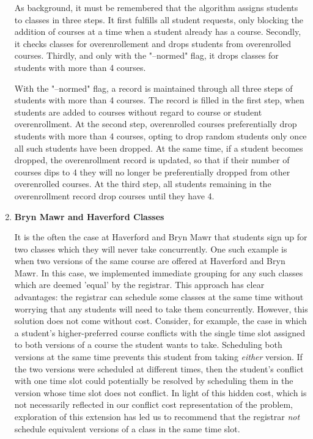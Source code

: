 \documentclass[11pt, oneside]{article}   	%
\begin{document}
\begin{enumerate}
As background, it must be remembered that the algorithm assigns students to classes in three steps. It first fulfills all student requests, only blocking the addition of courses at a time when a student already has a course. Secondly, it checks classes for overenrollement and drops students from overenrolled courses. Thirdly, and only with the "--normed" flag, it drops classes for students with more than 4 courses.

With the "--normed" flag, a record is maintained through all three steps of students with more than 4 courses. The record is filled in the first step, when students are added to courses without regard to course or student overenrollment. At the second step, overenrolled courses preferentially drop students with more than 4 courses, opting to drop random students only once all such students have been dropped. At the same time, if a student becomes dropped, the overenrollment record is updated, so that if their number of courses dips to 4 they will no longer be preferentially dropped from other overenrolled courses. At the third step, all students remaining in the overenrollment record drop courses until they have 4.

\item{\textbf{Bryn Mawr and Haverford Classes}}

It is the often the case at Haverford and Bryn Mawr that students sign up for two classes which they will never take concurrently. One such example is when two versions of the same course are offered at Haverford and Bryn Mawr. In this case, we implemented immediate grouping for any such classes which are deemed 'equal' by the registrar. This approach has clear advantages: the registrar can schedule some classes at the same time without worrying that any students will need to take them concurrently. However, this solution does not come without cost. Consider, for example, the case in which a student's higher-preferred course conflicts with the single time slot assigned to both versions of a course the student wants to take. Scheduling both versions at the same time prevents this student from taking \textit{either} version. If the two versions were scheduled at different times, then the student's conflict with one time slot could potentially be resolved by scheduling them in the version whose time slot does not conflict. In light of this hidden cost, which is not necessarily reflected in our conflict cost representation of the problem, exploration of this extension has led us to recommend that the registrar \textit{not} schedule equivalent versions of a class in the same time slot.

\end{enumerate}
\end{document}
